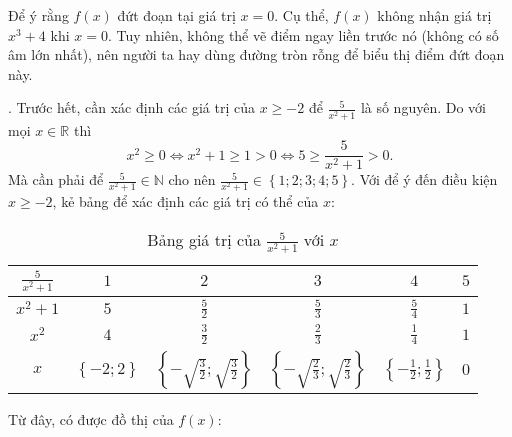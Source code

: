 Để ý rằng $f(x)$ đứt đoạn tại giá trị $x = 0$. Cụ thể, $f(x)$ không nhận giá trị $x^3 + 4$ khi $x = 0$. Tuy nhiên, không thể vẽ điểm ngay liền trước nó (không có số âm lớn nhất), nên người ta hay dùng đường tròn rỗng để biểu thị điểm đứt đoạn này.

. Trước hết, cần xác định các giá trị của $x \geq -2$ để $\frac{5}{x^2 + 1}$ là số nguyên. Do với mọi $x \in \mathbb{R}$ thì $$x^2 \geq 0 \iff x^2 + 1 \geq 1 > 0 \iff 5 \geq \frac{5}{x^2 + 1} > 0.$$ Mà cần phải để $\frac{5}{x^2 + 1} \in \mathbb{N}$ cho nên $\frac{5}{x^2 + 1} \in \left\{1; 2; 3; 4; 5\right\}$. Với để ý đến điều kiện $x \geq -2$, kẻ bảng để xác định các giá trị có thể của $x$:

\begin{table}[H]
   \centering
   \begin{tabular}{|c|c|c|c|c|c|}
   \hline
   $\displaystyle \frac{5}{x^2 + 1}$ & $1$ & $2$ & $3$ & $4$ & $5$ \\
   \hline
   $x^2 + 1$ & $5$ & $\displaystyle\frac{5}{2}$ & $\displaystyle\frac{5}{3}$ & $\displaystyle\frac{5}{4}$ & $1$ \\
   \hline
   $x^2$ & $4$ & $\displaystyle\frac{3}{2}$ & $\displaystyle\frac{2}{3}$ & $\displaystyle\frac{1}{4}$ & $1$ \\
   \hline
   $x$ & $\left\{-2; 2\right\}$ & $\left\{-\sqrt{\frac{3}{2}}; \sqrt{\frac{3}{2}}\right\}$ & $\left\{-\sqrt{\frac{2}{3}}; \sqrt{\frac{2}{3}}\right\}$ & $\left\{-\frac{1}{2}; \frac{1}{2}\right\}$ & $0$ \\
   \hline
   \end{tabular}
   \caption{Bảng giá trị của $\frac{5}{x^2 + 1}$ với $x$} 
\end{table}

Từ đây, có được đồ thị của $f(x)$:

